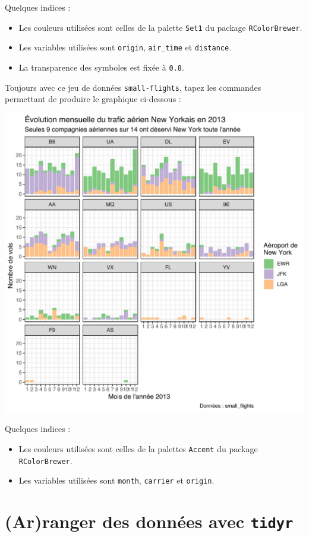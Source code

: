 \documentclass[
  a4paper,
]{article}
\providecommand{\tightlist}{%
  \setlength{\itemsep}{0pt}\setlength{\parskip}{0pt}}
\begin{document}
Quelques indices :

\begin{itemize}
\tightlist
\item
  Les couleurs utilisées sont celles de la palette \texttt{Set1} du package \texttt{RColorBrewer}.
\item
  Les variables utilisées sont \texttt{origin}, \texttt{air\_time} et \texttt{distance}.
\item
  La transparence des symboles est fixée à \texttt{0.8}.
\end{itemize}

Toujours avec ce jeu de données \texttt{small-flights}, tapez les commandes permettant de produire le graphique ci-dessous :

\begin{center}\includegraphics[width=0.9\linewidth]{figure/exercice2-1} \end{center}

Quelques indices :

\begin{itemize}
\tightlist
\item
  Les couleurs utilisées sont celles de la palettes \texttt{Accent} du package \texttt{RColorBrewer}.
\item
  Les variables utilisées sont \texttt{month}, \texttt{carrier} et \texttt{origin}.
\end{itemize}

\hypertarget{tidyr}{%
\section{\texorpdfstring{(Ar)ranger des données avec \texttt{tidyr}}{(Ar)ranger des données avec tidyr}}\label{tidyr}}
\end{document}
